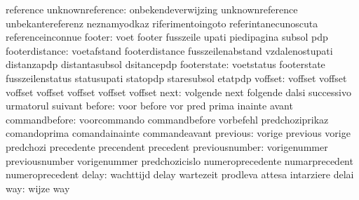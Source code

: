                            reference
         unknownreference: onbekendeverwijzing       unknownreference
                           unbekantereferenz         neznamyodkaz
                           riferimentoingoto         referintanecunoscuta
                           referenceinconnue
                   footer: voet                      footer
                           fusszeile                 upati
                           piedipagina               subsol
                           pdp
           footerdistance: voetafstand               footerdistance
                           fusszeilenabstand         vzdalenostupati
                           distanzapdp               distantasubsol
                           dsitancepdp
              footerstate: voetstatus                footerstate
                           fusszeilenstatus          statusupati
                           statopdp                  staresubsol
                           etatpdp
                  voffset: voffset                   voffset
                           voffset                   voffset
                           voffset                   voffset
                           voffset
                     next: volgende                  next
                           folgende                  dalsi
                           successivo                urmatorul
                           suivant
                   before: voor                      before
                           vor                       pred
                           prima                     inainte
                           avant
            commandbefore: voorcommando              commandbefore
                           vorbefehl                 predchoziprikaz
                           comandoprima              comandainainte
                           commandeavant
                 previous: vorige                    previous
                           vorige                    predchozi
                           precedente                precendent
                           precedent
           previousnumber: vorigenummer              previousnumber
                           vorigenummer              predchozicislo
                           numeroprecedente          numarprecedent
                           numeroprecedent
                    delay: wachttijd                 delay
                           wartezeit                 prodleva
                           attesa                    intarziere
                           delai
                      way: wijze                     way
